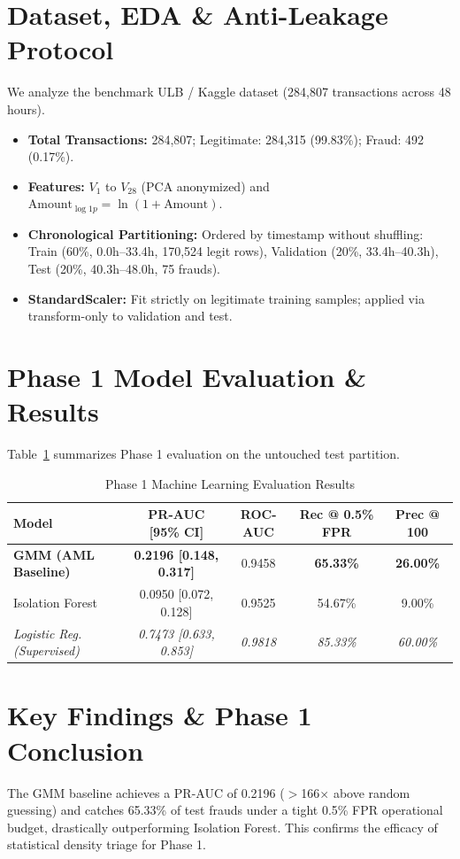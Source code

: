 \documentclass[conference]{IEEEtran}
\begin{document}
\section{Dataset, EDA \& Anti-Leakage Protocol}
We analyze the benchmark ULB / Kaggle dataset (284,807 transactions across 48 hours).
\begin{itemize}
    \item \textbf{Total Transactions:} 284,807; Legitimate: 284,315 (99.83\%); Fraud: 492 (0.17\%).
    \item \textbf{Features:} $V_1$ to $V_{28}$ (PCA anonymized) and $\text{Amount}_{\log 1p} = \ln(1 + \text{Amount})$.
    \item \textbf{Chronological Partitioning:} Ordered by timestamp without shuffling: Train (60\%, 0.0h--33.4h, 170,524 legit rows), Validation (20\%, 33.4h--40.3h), Test (20\%, 40.3h--48.0h, 75 frauds).
    \item \textbf{StandardScaler:} Fit strictly on legitimate training samples; applied via transform-only to validation and test.
\end{itemize}

\section{Phase 1 Model Evaluation \& Results}
Table~\ref{tab:phase1_results} summarizes Phase 1 evaluation on the untouched test partition.

\begin{table}[h]
\centering
\caption{Phase 1 Machine Learning Evaluation Results}
\label{tab:phase1_results}
\begin{tabular}{lcccc}
\toprule
\textbf{Model} & \textbf{PR-AUC [95\% CI]} & \textbf{ROC-AUC} & \textbf{Rec @ 0.5\% FPR} & \textbf{Prec @ 100} \\
\midrule
\textbf{GMM (AML Baseline)} & \textbf{0.2196 [0.148, 0.317]} & 0.9458 & \textbf{65.33\%} & \textbf{26.00\%} \\
Isolation Forest & 0.0950 [0.072, 0.128] & 0.9525 & 54.67\% & 9.00\% \\
\midrule
\textit{Logistic Reg. (Supervised)} & \textit{0.7473 [0.633, 0.853]} & \textit{0.9818} & \textit{85.33\%} & \textit{60.00\%} \\
\bottomrule
\end{tabular}
\end{table}

\section{Key Findings & Phase 1 Conclusion}
The GMM baseline achieves a PR-AUC of 0.2196 ($>$166$\times$ above random guessing) and catches 65.33\% of test frauds under a tight 0.5\% FPR operational budget, drastically outperforming Isolation Forest. This confirms the efficacy of statistical density triage for Phase 1.
\end{document}
